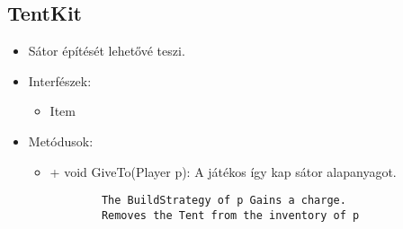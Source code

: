 \subsection{TentKit}
\begin{itemize}
	\item Sátor építését lehetővé teszi.
	\item Interfészek:
	\begin{itemize}
		\item Item
	\end{itemize}
	\item Metódusok:
	\begin{itemize}
		\item + void GiveTo(Player p): A játékos így kap sátor alapanyagot.
		\begin{lstlisting}
		The BuildStrategy of p Gains a charge.
		Removes the Tent from the inventory of p
		\end{lstlisting}
	\end{itemize}
\end{itemize}


